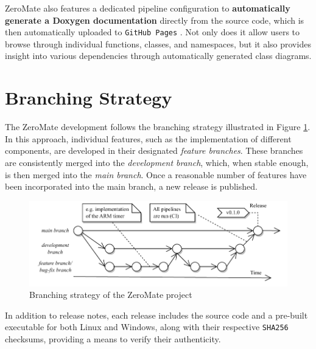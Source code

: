 \documentclass[english, ing, kiv, he, iso690numb, pdf]{fasthesis}
\begin{document}
	ZeroMate also features a dedicated pipeline configuration to \textbf{automatically generate a Doxygen documentation} directly from the source code, which is then automatically uploaded to \texttt{GitHub Pages} \cite{ZeroMate-docs}. Not only does it allow users to browse through individual functions, classes, and namespaces, but it also provides insight into various dependencies through automatically generated class diagrams.
	
	\section{Branching Strategy} \label{section-Branching-Strategy}
	
	The ZeroMate development follows the branching strategy illustrated in Figure \ref{Branching strategy of the ZeroMate project}. In this approach, individual features, such as the implementation of different components, are developed in their designated \textit{feature branches}. These branches are consistently merged into the \textit{development branch}, which, when stable enough, is then merged into the \textit{main branch}. Once a reasonable number of features have been incorporated into the main branch, a new release is published.
	
	\begin{figure}[ht]
		\centering
		\includegraphics[width=1.0\textwidth]{img/diagrams/branching_strategy.pdf}
		\caption{Branching strategy of the ZeroMate project\protect\footnotemark}
		\label{Branching strategy of the ZeroMate project}
	\end{figure}
	
	In addition to release notes, each release includes the source code and a pre-built executable for both Linux and Windows, along with their respective \texttt{SHA256} checksums, providing a means to verify their authenticity.
	
	
\end{document}
